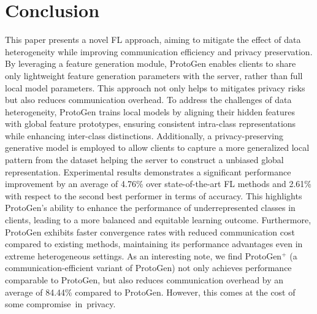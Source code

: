 \documentclass[lettersize,journal]{IEEEtran}
\newcommand{\todoa}[1]{\textcolor{blue}{[#1]}}
\begin{document}
\section{Conclusion}
\label{sec:conclusion}
This paper presents a novel FL approach, aiming to mitigate the effect of data heterogeneity while improving communication efficiency and privacy preservation. By leveraging a feature generation module, \textsf{ProtoGen} enables clients to share only lightweight feature generation parameters with the server, rather than full local model parameters. This approach not only helps to mitigates privacy risks but also reduces communication overhead. To address the challenges of data heterogeneity, \textsf{ProtoGen} trains local models by aligning their hidden features with global feature prototypes, ensuring consistent intra-class representations while enhancing inter-class distinctions. Additionally, a privacy-preserving generative model is employed to allow clients to capture a more generalized local pattern from the dataset helping the server to construct a unbiased global representation. 
Experimental results demonstrates a significant performance improvement by an average of 4.76\% over state-of-the-art FL methods and 2.61\% with respect to the second best performer in terms of accuracy. This highlights \textsf{ProtoGen}’s ability to enhance the performance of underrepresented classes in clients, leading to a more balanced and equitable learning outcome. Furthermore, \textsf{ProtoGen} exhibits faster convergence rates with reduced communication cost compared to existing methods, maintaining its performance advantages even in extreme heterogeneous settings. 
As an interesting note, we find \textsf{ProtoGen}$^+$ (a communication-efficient variant of \textsf{ProtoGen}) not only achieves performance comparable to \textsf{ProtoGen}, but also reduces communication overhead by an average of 84.44\% compared to \textsf{ProtoGen}. However, this comes at the cost of  some compromise in privacy.






% 
% 

\end{document}
